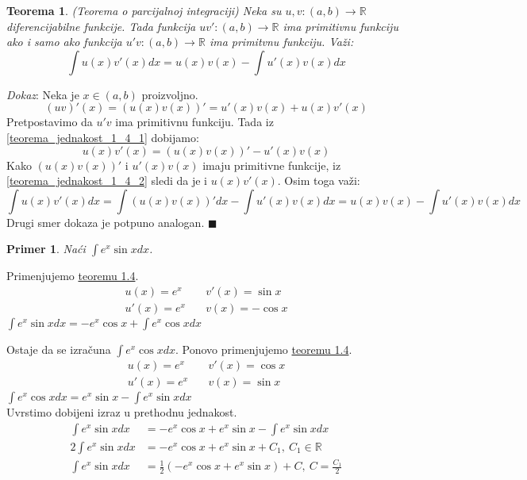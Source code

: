 \documentclass{article}
\newtheorem{teorema}{Teorema}[section]
\newtheorem{prim}{Primer}[section]
\begin{document}
\setcounter{equation}{0}
\begin{teoremabox}
    \begin{teorema} \label{teorema_1.4}
        (Teorema o parcijalnoj integraciji) Neka su
        $u, v: (a, b) \longrightarrow \mathbb{R}$ diferencijabilne
        funkcije. Tada funkcija $u v':(a, b) \longrightarrow \mathbb{R}$
        ima primitivnu funkciju ako i samo ako funkcija $u' v: (a, b) \longrightarrow \mathbb{R}$
        ima primitvnu funkciju. Važi:
        $$\int u(x)v'(x)dx = u(x)v(x) -\int u'(x)v(x)dx$$
    \end{teorema}
\end{teoremabox}
\textit{Dokaz}: Neka je $x \in (a, b)$ proizvoljno.
\begin{equation}\label{teorema_jednakost_1_4_1}
    (uv)'(x) = (u(x) v(x))' = u'(x)v(x) + u(x)v'(x)
\end{equation}
Pretpostavimo da $u'v$ ima primitivnu funkciju. Tada iz \eqref{teorema_jednakost_1_4_1} dobijamo:
\begin{equation}\label{teorema_jednakost_1_4_2}
    u(x)v'(x) = (u(x) v(x))' - u'(x)v(x)
\end{equation}
Kako $(u(x)v(x))'$ i $u'(x)v(x)$ imaju primitivne funkcije,
iz \eqref{teorema_jednakost_1_4_2} sledi da je i $u(x)v'(x)$. Osim toga važi:
\begin{equation*}
    \int u(x)v'(x)dx = \int(u(x)v(x))'dx - \int u'(x)v(x)dx = u(x)v(x) -\int u'(x)v(x)dx
\end{equation*}
Drugi smer dokaza je potpuno analogan.
\null\hfill $\blacksquare$ \par
\begin{primbox}
    \begin{prim}
        Naći $\int e^x \sin x dx$.
    \end{prim}
    Primenjujemo \hyperref[teorema_1.4]{teoremu 1.4}.
    \begin{align*}
        u(x) = e^x  & \quad v'(x) = \sin x \\
        u'(x) = e^x & \quad v(x) = -\cos x
    \end{align*}
    $\int e^x\sin x dx = -e^x\cos x + \int e^x \cos xdx $\par
    Ostaje da se izračuna $\int e^x\cos x dx$. Ponovo primenjujemo \hyperref[teorema_1.4]{teoremu 1.4}.
    \begin{align*}
        u(x) = e^x  & \quad v'(x) = \cos x \\
        u'(x) = e^x & \quad v(x) = \sin x
    \end{align*}
    $\int e^x\cos x dx = e^x\sin x - \int e^x\sin x dx$\\
    Uvrstimo dobijeni izraz u prethodnu jednakost.
    \begin{align*}
        \int e^x \sin x dx  & = -e^x\cos x + e^x \sin x - \int e^x \sin x dx             \\
        2\int e^x \sin x dx & = -e^x\cos x + e^x \sin x +C_1,\ C_1\in\mathbb{R}          \\
        \int e^x \sin x dx  & = \frac{1}{2}(-e^x\cos x + e^x \sin x)+C,\ C=\frac{C_1}{2}
    \end{align*}
\end{primbox}
\end{document}

